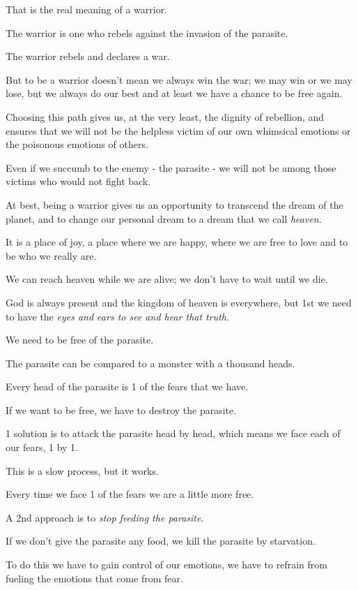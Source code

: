 \documentclass{article}
\numberwithin{equation}{section}
\begin{document}
That is the real meaning of a warrior.

The warrior is one who rebels against the invasion of the parasite.

The warrior rebels and declares a war.

But to be a warrior doesn't mean we always win the war; we may win or we may lose, but we always do our best and at least we have a chance to be free again.

Choosing this path gives us, at the very least, the dignity of rebellion, and ensures that we will not be the helpless victim of our own whimsical emotions or the poisonous emotions of others.

Even if we succumb to the enemy - the parasite - we will not be among those victims who would not fight back.

%
At best, being a warrior gives us an opportunity to transcend the dream of the planet, and to change our personal dream to a dream that we call \textit{heaven}.


It is a place of joy, a place where we are happy, where we are free to love and to be who we really are.

We can reach heaven while we are alive; we don't have to wait until we die.

God is always present and the kingdom of heaven is everywhere, but 1st we need to have the \textit{eyes and ears to see and hear that truth}.

We need to be free of the parasite.

%
The parasite can be compared to a monster with a thousand heads.

Every head of the parasite is 1 of the fears that we have.

If we want to be free, we have to destroy the parasite.

1 solution is to attack the parasite head by head, which means we face each of our fears, 1 by 1.

This is a slow process, but it works.

Every time we face 1 of the fears we are a little more free.

%
A 2nd approach is to \textit{stop feeding the parasite}.

If we don't give the parasite any food, we kill the parasite by starvation.

To do this we have to gain control of our emotions, we have to refrain from fueling the emotions that come from fear.
\end{document}
